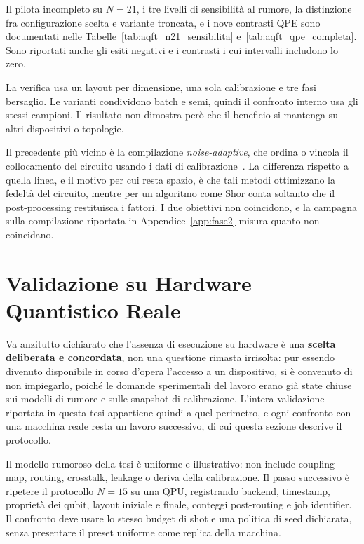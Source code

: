 \begin{onehalfspace}
Il pilota incompleto su $N=21$, i tre livelli di sensibilità al rumore,
la distinzione fra configurazione scelta e variante troncata, e i nove
contrasti QPE sono documentati nelle Tabelle~\ref{tab:aqft_n21_sensibilita}
e~\ref{tab:aqft_qpe_completa}. Sono riportati anche gli esiti negativi
e i contrasti i cui intervalli includono lo zero.

La verifica usa un layout per dimensione, una sola calibrazione e tre fasi bersaglio. Le varianti condividono batch e semi, quindi il confronto interno usa gli stessi campioni. Il risultato non dimostra però che il beneficio si mantenga su altri dispositivi o topologie.

Il precedente più vicino è la compilazione \emph{noise-adaptive}, che ordina o vincola il
collocamento del circuito usando i dati di calibrazione~\cite{murali2019, tannu2019}. La
differenza rispetto a quella linea, e il motivo per cui resta spazio, è che tali metodi
ottimizzano la fedeltà del circuito, mentre per un algoritmo come Shor conta soltanto che
il post-processing restituisca i fattori. I due obiettivi non coincidono, e la campagna
sulla compilazione riportata in Appendice~\ref{app:fase2} misura quanto non coincidano.

\section{Validazione su Hardware Quantistico Reale}
\label{sec:hw_reale}

Va anzitutto dichiarato che l'assenza di esecuzione su hardware è una
\textbf{scelta deliberata e concordata}, non una questione rimasta
irrisolta: pur essendo divenuto disponibile in corso d'opera l'accesso a
un dispositivo, si è convenuto di non impiegarlo, poiché le domande
sperimentali del lavoro erano già state chiuse sui modelli di rumore e
sulle snapshot di calibrazione. L'intera validazione riportata in questa
tesi appartiene quindi a quel perimetro, e ogni confronto con una
macchina reale resta un lavoro successivo, di cui questa sezione descrive
il protocollo.

Il modello rumoroso della tesi è uniforme e illustrativo: non include
coupling map, routing, crosstalk, leakage o deriva della calibrazione. Il
passo successivo è ripetere il protocollo $N=15$ su una QPU, registrando
backend, timestamp, proprietà dei qubit, layout iniziale e finale,
conteggi post-routing e job identifier. Il confronto deve usare lo stesso
budget di shot e una politica di seed dichiarata, senza presentare il
preset uniforme come replica della macchina.


\end{onehalfspace}
